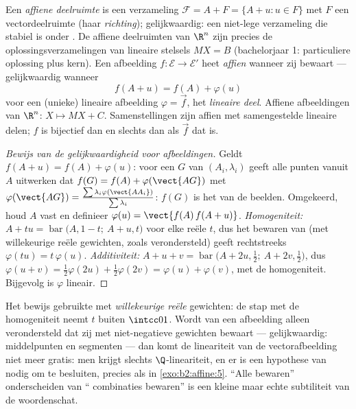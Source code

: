 \begin{definition}\label{def:b2:affine:subspace}
Een \emph{affiene deelruimte} is een verzameling $\mathcal{F} = A +
F = \{A + u : u \in F\}$ met $F$ een vectordeelruimte (haar
\emph{richting}); gelijkwaardig: een niet-lege verzameling die
stabiel is onder . De affiene deelruimten van $\R^n$ zijn
precies de oplossingsverzamelingen van lineaire stelsels $MX = B$
(bachelorjaar 1: particuliere oplossing plus kern). Een afbeelding
$f \colon \mathcal{E} \to \mathcal{E}'$ heet
\emph{affien} wanneer zij 
bewaart --- gelijkwaardig wanneer
\[
f(A + u) = f(A) + \varphi(u)
\]
voor een (unieke) lineaire afbeelding $\varphi = \vec f$, het
\emph{lineaire deel}. Affiene afbeeldingen van $\R^n$: $X \mapsto
MX + C$. Samenstellingen zijn affien met samengestelde lineaire
delen; $f$ is bijectief dan en slechts dan als $\vec f$ dat is.
\end{definition}

\begin{proof}[Bewijs van de gelijkwaardigheid voor afbeeldingen]
Geldt $f(A + u) = f(A) + \varphi(u)$: voor een  $G$ van
$(A_i, \lambda_i)$ geeft alle punten vanuit $A$ uitwerken dat $f(G)
= f(A) + \varphi(\vect{AG})$ met $\varphi(\vect{AG}) =
\frac{\sum\lambda_i\varphi(\vect{AA_i})}{\sum\lambda_i}$: $f(G)$ is
het  van de beelden. Omgekeerd, houd $A$ vast en
definieer $\varphi(u) = \vect{f(A)\,f(A + u)}$.
\emph{Homogeniteit:} $A + tu = \operatorname{bar}\bigl(A, 1-t;\ A +
u, t\bigr)$ voor elke reële $t$, dus het bewaren van 
(met willekeurige reële gewichten, zoals verondersteld) geeft
rechtstreeks $\varphi(tu) = t\,\varphi(u)$. \emph{Additiviteit:} $A
+ u + v = \operatorname{bar}\bigl(A + 2u, \tfrac12;\ A + 2v,
\tfrac12\bigr)$, dus $\varphi(u + v) = \tfrac12\varphi(2u) +
\tfrac12\varphi(2v) = \varphi(u) + \varphi(v)$, met de
homogeniteit. Bijgevolg is $\varphi$ lineair.
\end{proof}

\begin{remark}
Het bewijs gebruikte  met \emph{willekeurige reële}
gewichten: de stap met de homogeniteit neemt $t$ buiten
$\intcc01$. Wordt van een afbeelding alleen verondersteld dat zij
 met niet-negatieve gewichten bewaart --- gelijkwaardig:
middelpunten en segmenten --- dan komt de lineariteit van de
vectorafbeelding niet meer gratis: men krijgt slechts
$\Q$-lineariteit, en er is een hypothese van  nodig om
te besluiten, precies als in \cref{exo:b2:affine:5}. ``Alle
 bewaren'' onderscheiden van `` combinaties
bewaren'' is een kleine maar echte subtiliteit van de 
woordenschat.
\end{remark}

